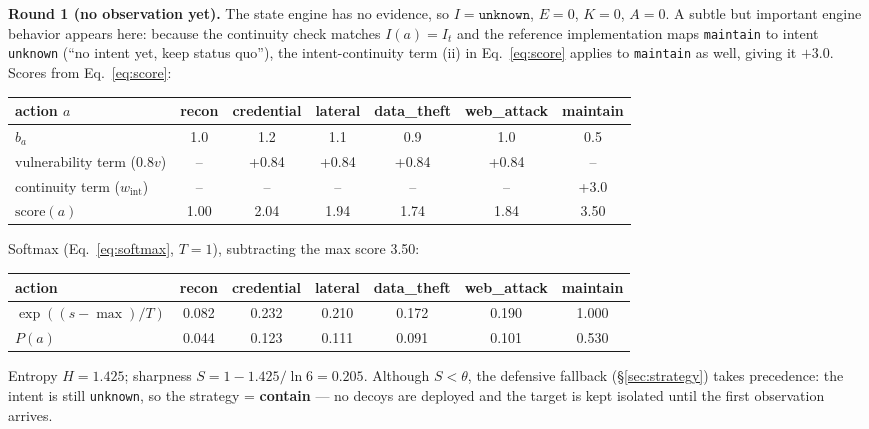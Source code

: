 \documentclass[11pt]{article}
\newcommand{\act}[1]{\texttt{#1}}
\begin{document}
\textbf{Round 1 (no observation yet).} The state engine has no evidence, so
$I=\act{unknown}$, $E=0$, $K=0$, $A=0$. A subtle but important engine
behavior appears here: because the continuity check matches
$I(a) = I_t$ and the reference implementation maps \act{maintain} to
intent \act{unknown} (``no intent yet, keep status quo''), the
intent-continuity term (ii) in Eq.~\ref{eq:score} applies to
\act{maintain} as well, giving it $+3.0$. Scores from Eq.~\ref{eq:score}:
\begin{center}
\begin{adjustbox}{max width=\linewidth}\begin{tabular}{lcccccc}
\toprule
action $a$ & recon & credential & lateral & data\_theft & web\_attack & maintain \\
\midrule
$b_a$ & 1.0 & 1.2 & 1.1 & 0.9 & 1.0 & 0.5 \\
vulnerability term ($0.8v$) & -- & +0.84 & +0.84 & +0.84 & +0.84 & -- \\
continuity term ($w_{\mathrm{int}}$) & -- & -- & -- & -- & -- & +3.0 \\
$\mathrm{score}(a)$ & 1.00 & 2.04 & 1.94 & 1.74 & 1.84 & 3.50 \\
\bottomrule
\end{tabular}\end{adjustbox}
\end{center}
Softmax (Eq.~\ref{eq:softmax}, $T{=}1$), subtracting the max score 3.50:
\begin{center}
\begin{adjustbox}{max width=\linewidth}\begin{tabular}{lcccccc}
\toprule
action & recon & credential & lateral & data\_theft & web\_attack & maintain \\
\midrule
$\exp((s-\max)/T)$ & 0.082 & 0.232 & 0.210 & 0.172 & 0.190 & 1.000 \\
$P(a)$ & 0.044 & 0.123 & 0.111 & 0.091 & 0.101 & 0.530 \\
\bottomrule
\end{tabular}\end{adjustbox}
\end{center}
Entropy $H = 1.425$; sharpness $S = 1 - 1.425/\ln 6 = 0.205$. Although
$S < \theta$, the defensive fallback (\S\ref{sec:strategy}) takes
precedence: the intent is still \act{unknown}, so the strategy =
\textbf{contain} --- no decoys are deployed and the target is kept
isolated until the first observation arrives.
\end{document}
